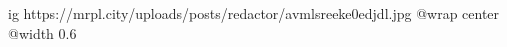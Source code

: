  
 
 
 
 

\ifcmt
  ig https://mrpl.city/uploads/posts/redactor/avmlsreeke0edjdl.jpg
  @wrap center
  @width 0.6
\fi
